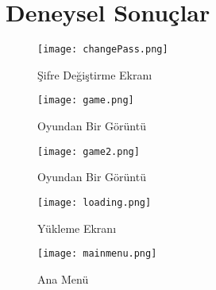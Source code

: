 \documentclass[conference]{IEEEtran}
\begin{document}
\section{Deneysel Sonuçlar}

\begin{figure}[ht] 
    \centering
    \texttt{[image: changePass.png]}
    \caption{Şifre Değiştirme Ekranı}
    \label{fig:spark}
\end{figure}
\begin{figure}[ht] 
    \centering
    \texttt{[image: game.png]}
    \caption{Oyundan Bir Görüntü}
    \label{fig:spark}
\end{figure}
\begin{figure}[ht] 
    \centering
    \texttt{[image: game2.png]}
    \caption{Oyundan Bir Görüntü}
    \label{fig:spark}
\end{figure}

\begin{figure}[ht] 
    \centering
    \texttt{[image: loading.png]}
    \caption{Yükleme Ekranı}
    \label{fig:spark}
\end{figure}
\begin{figure}[ht] 
    \centering
    \texttt{[image: mainmenu.png]}
    \caption{Ana Menü}
    \label{fig:spark}
\end{figure}
\newpage
\end{document}

